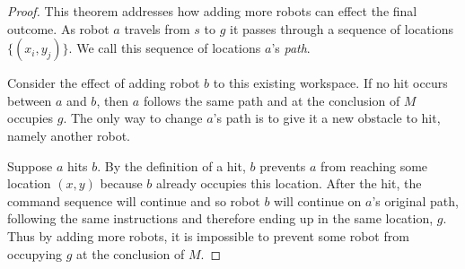 \documentclass[letterpaper, 10 pt, conference]{ieeeconf}
\newcommand{\todo}[1]{\vspace{5 mm}\par \noindent \framebox{\begin{minipage}[c]{0.98 \columnwidth} \ttfamily\flushleft \textcolor{red}{#1}\end{minipage}}\vspace{5 mm}\par}
\newtheorem{lemma}[theorem]{Lemma}
\begin{document}
\begin{proof} 
This theorem addresses how adding more robots can effect the final outcome. As robot $a$ travels from $s$ to $g$ it passes through a sequence of locations $\{(x_i,y_j)\}$.  We call this sequence of locations $a$'s \emph{path}.

Consider the effect of adding robot $b$ to this existing workspace. If no hit occurs between $a$ and $b$, then $a$ follows the same path and at the conclusion of $M$ occupies $g$. The only way to change $a$'s path is to give it a new obstacle to hit, namely another robot. 

Suppose $a$ hits $b$. By the definition of a hit, $b$ prevents $a$ from reaching some location $(x,y)$ because $b$ already occupies this location. After the hit, the command sequence will continue and so robot $b$ will continue on $a$'s original path, following the same instructions and therefore ending up in the same location, $g$. Thus by adding more robots, it is impossible to prevent some robot from occupying $g$ at the conclusion of $M$. 
\end{proof}



\end{document}
